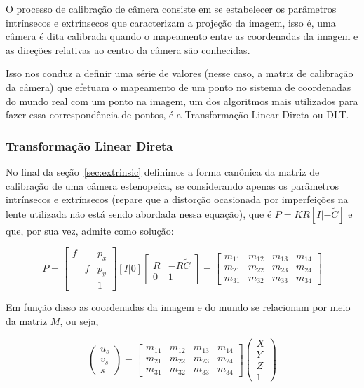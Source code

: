 \documentclass[ecp,tc]{iiufrgs}
\begin{document}
O processo de calibração de câmera consiste em se estabelecer os parâmetros intrínsecos e extrínsecos que caracterizam a projeção da imagem, isso é, uma câmera é dita calibrada quando o mapeamento entre as coordenadas da imagem e as direções  relativas ao centro da câmera são conhecidas.

Isso nos conduz a definir uma série de valores (nesse caso, a matriz de calibração da câmera) que efetuam o mapeamento de um ponto no sistema de coordenadas do mundo real com um ponto na imagem, um dos algoritmos mais utilizados para fazer essa correspondência de pontos, é a Transformação Linear Direta ou DLT.

\subsubsection{Transformação Linear Direta}

No final da seção~\ref{sec:extrinsic} definimos a forma canônica da matriz de calibração de uma câmera estenopeica, se considerando apenas os parâmetros intrínsecos e extrínsecos (repare que a distorção ocasionada por imperfeições na lente utilizada não está sendo abordada nessa equação), que é $ P = KR[I|-\widetilde{C}] $ e que, por sua vez, admite como solução:

\[
P = \begin{bmatrix} f & & p_x \\ & f & p_y \\ & & 1 \end{bmatrix} [I|0] 
\begin{bmatrix} R & -R\widetilde{C} \\ 0 & 1 \end{bmatrix} = 
\begin{bmatrix} m_{11} & m_{12} & m_{13} & m_{14} \\ m_{21} & m_{22} & m_{23} & m_{24} \\ m_{31} & m_{32} & m_{33} & m_{34} \end{bmatrix}
\]

Em função disso as coordenadas da imagem e do mundo se relacionam por meio da matriz $ M $, ou seja,

\[
\begin{pmatrix} u_s \\ v_s \\ s \end{pmatrix} = \begin{bmatrix} m_{11} & m_{12} & m_{13} & m_{14} \\ m_{21} & m_{22} & m_{23} & m_{24} \\ m_{31} & m_{32} & m_{33} & m_{34} \end{bmatrix} \begin{pmatrix} X \\ Y \\ Z \\ 1 \end{pmatrix}
\]
\end{document}
